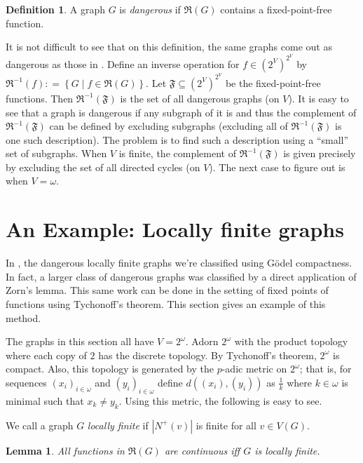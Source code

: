 \documentclass[12pt]{amsart}
\theoremstyle{plain}
\newtheorem{lem}[thm]{Lemma}
\theoremstyle{definition}
\newtheorem{defn}{Definition}
\theoremstyle{remark}
\newcommand{\R}{\mathfrak{R}}
\newcommand{\F}{\mathfrak{F}}
\newcommand{\setbs}[2]{\left\{ #1 \mid #2 \right\}}
\newcommand{\card}[1]{\left|#1\right|}
\newcommand{\parens}[1]{\left( #1 \right)}
\newcommand{\DefinedAs}{\mathrel{\mathop:}=}
\begin{document}
\begin{defn}
A graph $G$ is \emph{dangerous} if $\R(G)$ contains a fixed-point-free function.
\end{defn}

It is not difficult to see that on this definition, the same graphs come out as dangerous as those in \cite{danger}. Define an inverse operation for $f \in \parens{2^V}^{2^V}$ by $\R^{-1}(f) \DefinedAs \setbs{G}{f \in \R(G)}$.  Let $\F \subseteq \parens{2^V}^{2^V}$ be the fixed-point-free functions.  Then $\R^{-1}(\F)$ is the set of all dangerous graphs (on $V$).  It is easy to see that a graph is dangerous if any subgraph of it is and thus the complement of $\R^{-1}(\F)$ can be defined by excluding subgraphs (excluding all of $\R^{-1}(\F)$ is one such description).  The problem is to find such a description using a ``small'' set of subgraphs.  When $V$ is finite, the complement of $\R^{-1}(\F)$ is given precisely by excluding the set of all directed cycles (on $V$).  The next case to figure out is when $V = \omega$.  

\section{An Example: Locally finite graphs}
In \cite{danger}, the dangerous locally finite graphs we're classified using G\"{o}del compactness.  In fact, a larger class of dangerous graphs was classified by a direct application of Zorn's lemma.  This same work can be done in the setting of fixed points of functions using Tychonoff's theorem.  This section gives an example of this method.

The graphs in this section all have $V = 2^\omega$. Adorn $2^\omega$ with the product topology where each copy of $2$ has the discrete topology.  By Tychonoff's theorem, $2^\omega$ is compact.  Also, this topology is generated by the $p$-adic metric on $2^\omega$; that is, for sequences $(x_i)_{i \in \omega}$ and $(y_i)_{i \in \omega}$ define $d((x_i), (y_i))$ as $\frac{1}{k}$ where $k \in \omega$ is minimal such that $x_k \neq y_k$.  Using this metric, the following is easy to see. 

We call a graph $G$ \emph{locally finite} if $\card{N^+(v)}$ is finite for all $v \in V(G)$.

\begin{lem}\label{LocallyFiniteImpliesContinuous}
All functions in $\R(G)$ are continuous iff $G$ is locally finite.
\end{lem}
\end{document}
